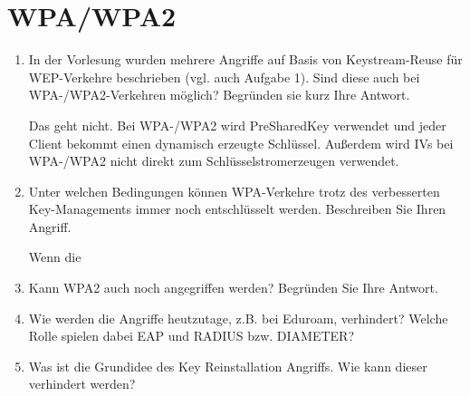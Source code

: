 \documentclass[12pt,a4paper]{article}
\newenvironment{exercise}
	{\begin{enumerate}[label=\bfseries\alph*).]\bfseries}
{\end{enumerate}}
\newenvironment{answer}{\par\normalfont}{}
\begin{document}
    \section{WPA/WPA2}
    	\begin{exercise}
    		\item In der Vorlesung wurden mehrere Angriffe auf Basis von Keystream-Reuse für WEP-Verkehre beschrieben (vgl. auch Aufgabe 1). Sind diese auch bei WPA-/WPA2-Verkehren möglich? Begründen sie kurz Ihre Antwort.
    			\begin{answer}
    				Das geht nicht. Bei WPA-/WPA2 wird PreSharedKey verwendet und jeder Client bekommt einen dynamisch erzeugte Schlüssel. Außerdem wird IVs bei WPA-/WPA2 nicht direkt zum Schlüsselstromerzeugen verwendet.
    			\end{answer}
    		\item Unter welchen Bedingungen können WPA-Verkehre trotz des verbesserten Key-Managements immer noch entschlüsselt werden. Beschreiben Sie Ihren Angriff.
    		\begin{answer}
    			Wenn die 
    		\end{answer}
    		\item Kann WPA2 auch noch angegriffen werden? Begründen Sie Ihre Antwort.
    		\item Wie werden die Angriffe heutzutage, z.B. bei Eduroam, verhindert? Welche Rolle spielen dabei EAP und RADIUS bzw. DIAMETER?
    		\item Was ist die Grundidee des Key Reinstallation Angriffs. Wie kann dieser verhindert werden?
    		
    	\end{exercise}
\end{document}
